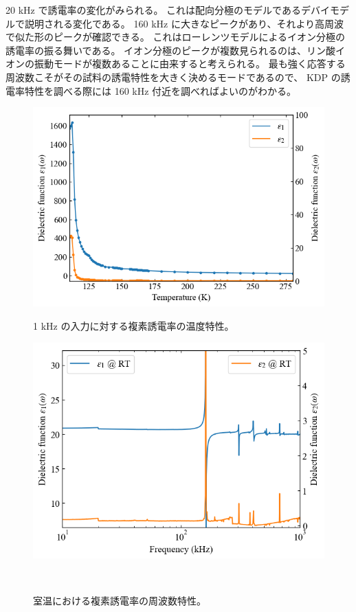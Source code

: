 \documentclass[9pt,dvipdfmx,a4paper]{jsarticle}
\begin{document}
20 kHz で誘電率の変化がみられる。
これは配向分極のモデルであるデバイモデルで説明される変化である。
160 kHz に大きなピークがあり、それより高周波で似た形のピークが確認できる。
これはローレンツモデルによるイオン分極の誘電率の振る舞いである\cite{onodera}。
イオン分極のピークが複数見られるのは、リン酸イオンの振動モードが複数あることに由来すると考えられる。
最も強く応答する周波数こそがその試料の誘電特性を大きく決めるモードであるので、
KDP の誘電率特性を調べる際には 160 kHz 付近を調べればよいのがわかる。
\begin{figure}[t]
    \centering
    \begin{minipage}[t]{0.48\columnwidth}
        \centering
        \includegraphics[width = \columnwidth]{epsilon-Temp.png}
        \caption{\small{1 kHz の入力に対する複素誘電率の温度特性。}}
        \label{graph:epsilon-Temp}
    \end{minipage}
    \hfill
    \begin{minipage}[t]{0.48\columnwidth}
        \centering
        \includegraphics[width = \columnwidth]{epsilon-f_RT.png}
        \caption{\small{室温における複素誘電率の周波数特性。}}
        \label{graph:epsilon-f_RT}
    \end{minipage}\\


\end{figure}
\end{document}
